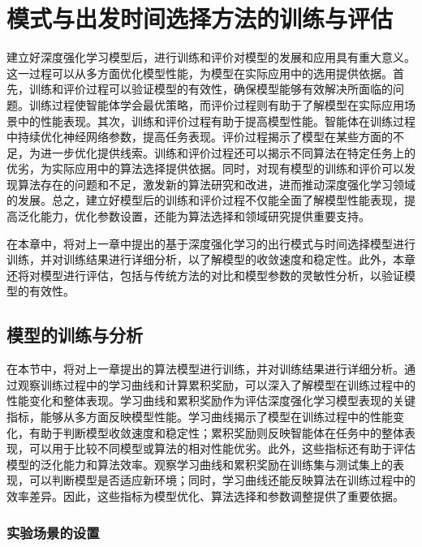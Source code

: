 \chapter{模式与出发时间选择方法的训练与评估}

建立好深度强化学习模型后，进行训练和评价对模型的发展和应用具有重大意义。这一过程可以从多方面优化模型性能，为模型在实际应用中的选用提供依据。首先，训练和评价过程可以验证模型的有效性，确保模型能够有效解决所面临的问题。训练过程使智能体学会最优策略，而评价过程则有助于了解模型在实际应用场景中的性能表现。其次，训练和评价过程有助于提高模型性能。智能体在训练过程中持续优化神经网络参数，提高任务表现。评价过程揭示了模型在某些方面的不足，为进一步优化提供线索。训练和评价过程还可以揭示不同算法在特定任务上的优劣，为实际应用中的算法选择提供依据。同时，对现有模型的训练和评价可以发现算法存在的问题和不足，激发新的算法研究和改进，进而推动深度强化学习领域的发展。总之，建立好模型后的训练和评价过程不仅能全面了解模型性能表现，提高泛化能力，优化参数设置，还能为算法选择和领域研究提供重要支持。


在本章中，将对上一章中提出的基于深度强化学习的出行模式与时间选择模型进行训练，并对训练结果进行详细分析，以了解模型的收敛速度和稳定性。此外，本章还将对模型进行评估，包括与传统方法的对比和模型参数的灵敏性分析，以验证模型的有效性。


\section{模型的训练与分析}
\label{section:5.1}

在本节中，将对上一章提出的算法模型进行训练，并对训练结果进行详细分析。通过观察训练过程中的学习曲线和计算累积奖励，可以深入了解模型在训练过程中的性能变化和整体表现。学习曲线和累积奖励作为评估深度强化学习模型表现的关键指标，能够从多方面反映模型性能。学习曲线揭示了模型在训练过程中的性能变化，有助于判断模型收敛速度和稳定性；累积奖励则反映智能体在任务中的整体表现，可以用于比较不同模型或算法的相对性能优劣。此外，这些指标还有助于评估模型的泛化能力和算法效率。观察学习曲线和累积奖励在训练集与测试集上的表现，可以判断模型是否适应新环境；同时，学习曲线还能反映算法在训练过程中的效率差异。因此，这些指标为模型优化、算法选择和参数调整提供了重要依据。

\subsection{实验场景的设置}

